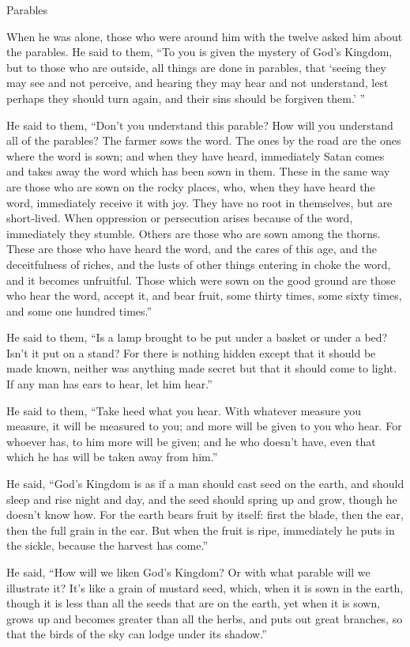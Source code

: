 \documentclass[10pt,twoside]{article} %
\begin{document}
\begin{section}{Parables}
{  When he was alone, those who were around him with the twelve asked him about the parables.   He said to them, ``To you is given the mystery of God's Kingdom, but to those who are outside, all things are done in parables,    that `seeing they may see and not perceive, and hearing they may hear and not understand, lest perhaps they should turn again, and their sins should be forgiven them.' ''

  He said to them, ``Don't you understand this parable? How will you understand all of the parables?    The farmer sows the word.    The ones by the road are the ones where the word is sown; and when they have heard, immediately Satan comes and takes away the word which has been sown in them.    These in the same way are those who are sown on the rocky places, who, when they have heard the word, immediately receive it with joy.    They have no root in themselves, but are short-lived. When oppression or persecution arises because of the word, immediately they stumble.    Others are those who are sown among the thorns. These are those who have heard the word,    and the cares of this age, and the deceitfulness of riches, and the lusts of other things entering in choke the word, and it becomes unfruitful.    Those which were sown on the good ground are those who hear the word, accept it, and bear fruit, some thirty times, some sixty times, and some one hundred times.''

  He said to them, ``Is a lamp brought to be put under a basket  or under a bed? Isn't it put on a stand?    For there is nothing hidden except that it should be made known, neither was anything made secret but that it should come to light.    If any man has ears to hear, let him hear.''

  He said to them, ``Take heed what you hear. With whatever measure you measure, it will be measured to you; and more will be given to you who hear.    For whoever has, to him more will be given; and he who doesn't have, even that which he has will be taken away from him.''

  He said, ``God's Kingdom is as if a man should cast seed on the earth,    and should sleep and rise night and day, and the seed should spring up and grow, though he doesn't know how.    For the earth bears fruit by itself: first the blade, then the ear, then the full grain in the ear.    But when the fruit is ripe, immediately he puts in the sickle, because the harvest has come.''

  He said, ``How will we liken God's Kingdom? Or with what parable will we illustrate it?    It's like a grain of mustard seed, which, when it is sown in the earth, though it is less than all the seeds that are on the earth,    yet when it is sown, grows up and becomes greater than all the herbs, and puts out great branches, so that the birds of the sky can lodge under its shadow.''

}
\end{section}
\end{document}
